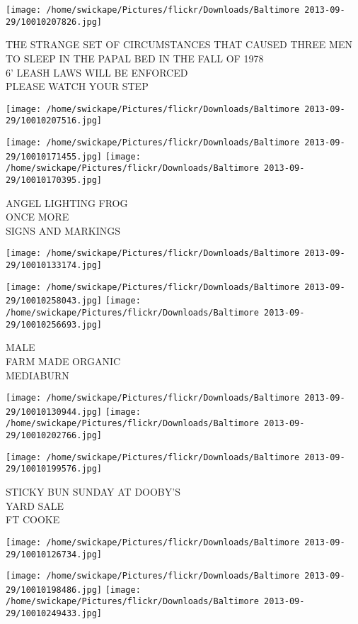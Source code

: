 \documentclass[10pt,letterpaper]{article}
\begin{document}
\texttt{[image: /home/swickape/Pictures/flickr/Downloads/Baltimore 2013-09-29/10010207826.jpg]}

THE STRANGE SET OF CIRCUMSTANCES THAT CAUSED THREE MEN TO SLEEP IN THE PAPAL BED IN THE FALL OF 1978\\
6' LEASH LAWS WILL BE ENFORCED\\
PLEASE WATCH YOUR STEP
\pagebreak

\texttt{[image: /home/swickape/Pictures/flickr/Downloads/Baltimore 2013-09-29/10010207516.jpg]}

\vspace{0.25in}
\texttt{[image: /home/swickape/Pictures/flickr/Downloads/Baltimore 2013-09-29/10010171455.jpg]}
\texttt{[image: /home/swickape/Pictures/flickr/Downloads/Baltimore 2013-09-29/10010170395.jpg]}

ANGEL LIGHTING FROG\\
ONCE MORE\\
SIGNS AND MARKINGS
\pagebreak

\texttt{[image: /home/swickape/Pictures/flickr/Downloads/Baltimore 2013-09-29/10010133174.jpg]}

\vspace{0.25in}
\texttt{[image: /home/swickape/Pictures/flickr/Downloads/Baltimore 2013-09-29/10010258043.jpg]}
\texttt{[image: /home/swickape/Pictures/flickr/Downloads/Baltimore 2013-09-29/10010256693.jpg]}

MALE\\
FARM MADE ORGANIC\\
MEDIABURN
\pagebreak

\texttt{[image: /home/swickape/Pictures/flickr/Downloads/Baltimore 2013-09-29/10010130944.jpg]}
\texttt{[image: /home/swickape/Pictures/flickr/Downloads/Baltimore 2013-09-29/10010202766.jpg]}

\texttt{[image: /home/swickape/Pictures/flickr/Downloads/Baltimore 2013-09-29/10010199576.jpg]}

STICKY BUN SUNDAY AT DOOBY'S\\
YARD SALE\\
FT COOKE
\pagebreak

\texttt{[image: /home/swickape/Pictures/flickr/Downloads/Baltimore 2013-09-29/10010126734.jpg]}

\vspace{0.25in}
\texttt{[image: /home/swickape/Pictures/flickr/Downloads/Baltimore 2013-09-29/10010198486.jpg]}
\texttt{[image: /home/swickape/Pictures/flickr/Downloads/Baltimore 2013-09-29/10010249433.jpg]}
\end{document}
